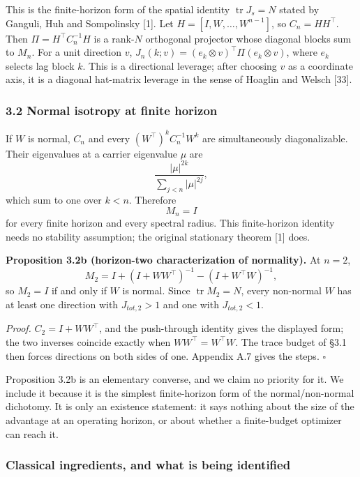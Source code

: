 \documentclass[
  10pt,
]{article}
\begin{document}
This is the finite-horizon form of the spatial identity
\(\operatorname{tr}J_s=N\) stated by Ganguli, Huh and Sompolinsky
{[}1{]}. Let \(H=[I,W,\ldots,W^{n-1}]\), so \(C_n=HH^\top\). Then
\(\Pi=H^\top C_n^{-1}H\) is a rank-\(N\) orthogonal projector whose
diagonal blocks sum to \(M_n\). For a unit direction \(v\),
\(J_n(k;v)=(e_k\otimes v)^\top\Pi(e_k\otimes v)\), where \(e_k\) selects
lag block \(k\). This is a directional leverage; after choosing \(v\) as
a coordinate axis, it is a diagonal hat-matrix leverage in the sense of
Hoaglin and Welsch {[}33{]}.

\subsubsection{3.2 Normal isotropy at finite
horizon}\label{normal-isotropy-at-finite-horizon}

If \(W\) is normal, \(C_n\) and every \((W^\top)^kC_n^{-1}W^k\) are
simultaneously diagonalizable. Their eigenvalues at a carrier eigenvalue
\(\mu\) are \[
\frac{|\mu|^{2k}}{\sum_{j<n}|\mu|^{2j}},
\] which sum to one over \(k<n\). Therefore \[
\boxed{M_n=I}
\] for every finite horizon and every spectral radius. This
finite-horizon identity needs no stability assumption; the original
stationary theorem {[}1{]} does.

\textbf{Proposition 3.2b (horizon-two characterization of normality).}
At \(n=2\), \[
M_2=I+(I+WW^\top)^{-1}-(I+W^\top W)^{-1},
\] so \(M_2=I\) if and only if \(W\) is normal. Since
\(\operatorname{tr}M_2=N\), every non-normal \(W\) has at least one
direction with \(J_{tot,2}>1\) and one with \(J_{tot,2}<1\).

\emph{Proof.} \(C_2=I+WW^\top\), and the push-through identity gives the
displayed form; the two inverses coincide exactly when
\(WW^\top=W^\top W\). The trace budget of §3.1 then forces directions on
both sides of one. Appendix A.7 gives the steps. \(\square\)

Proposition 3.2b is an elementary converse, and we claim no priority for
it. We include it because it is the simplest finite-horizon form of the
normal/non-normal dichotomy. It is only an existence statement: it says
nothing about the size of the advantage at an operating horizon, or
about whether a finite-budget optimizer can reach it.

\subsubsection{Classical ingredients, and what is being
identified}\label{classical-ingredients-and-what-is-being-identified}
\end{document}
